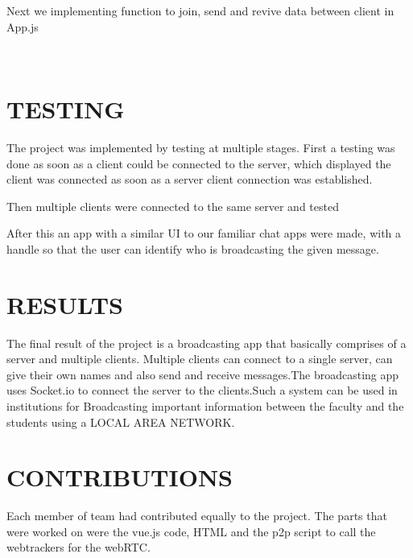 \documentclass{fisatproject}
\begin{document}
    

Next we implementing function to join, send and revive data between client in App.js
         \vspace{0.6cm}
 	 \begin{lstlisting}[language=java]
 	 
 	 \end{lstlisting}


\chapter{TESTING}
The project was implemented by testing at multiple stages.
First a testing was done as soon as a client could be connected to the server, which displayed the client was connected as soon as a server client connection was established.


Then multiple clients were connected to the same server and tested



After this an app with a similar UI to our familiar chat apps were made, with a handle so that the user can identify who is broadcasting the given message.
\chapter{RESULTS}


The final result of the project is a broadcasting app that basically comprises of a server and multiple clients. Multiple clients can connect to a single server, can give their own names and also send and receive messages.The broadcasting app uses Socket.io to connect the server to the clients.Such a system can be used in institutions for Broadcasting important information between the faculty and the students using a LOCAL AREA NETWORK.












\chapter{CONTRIBUTIONS}

Each member of team had contributed equally to the project. The parts that were worked on were the vue.js code, HTML and the p2p script to call the webtrackers for the webRTC. 
\end{document}
